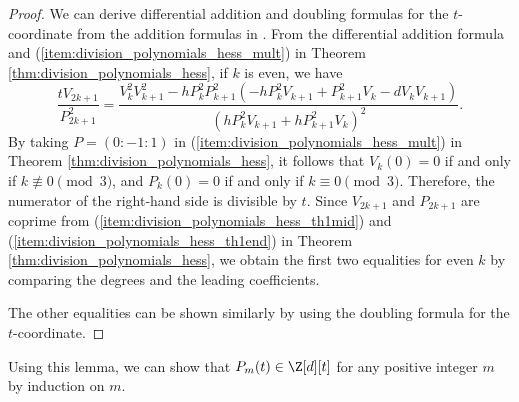 \documentclass{amsart}
\theoremstyle{definition}
\theoremstyle{remark}
\numberwithin{equation}{section}
\begin{document}
\begin{proof}
    We can derive differential addition and doubling formulas
    for the $t$-coordinate from the addition formulas in \cite[\S 2.1]{PKC:FarJoy10}.
    From the differential addition formula and
    (\ref{item:division_polynomials_hess_mult}) in Theorem \ref{thm:division_polynomials_hess},
    if $k$ is even, we have
    \begin{equation*}
        \frac{tV_{2k+1}}{P_{2k+1}^2}
        =
        \frac{V_k^2V_{k+1}^2 - hP_k^2 P_{k+1}^2
                        (-hP_k^2V_{k+1} + P_{k+1}^2 V_k - dV_kV_{k+1})}
            {(hP_k^2 V_{k+1} +hP_{k+1}^2 V_k)^2}.
    \end{equation*}
    By taking $P = (0:-1:1)$ in (\ref{item:division_polynomials_hess_mult}) in Theorem \ref{thm:division_polynomials_hess},
    it follows that $V_k(0) = 0$ if and only if $k \not\equiv 0 \pmod{3}$,
    and $P_k(0) = 0$ if and only if $k \equiv 0 \pmod{3}$.
    Therefore, the numerator of the right-hand side is divisible by $t$.
    Since $V_{2k+1}$ and $P_{2k+1}$ are coprime from
    (\ref{item:division_polynomials_hess_th1mid}) and (\ref{item:division_polynomials_hess_th1end}) in Theorem \ref{thm:division_polynomials_hess},
    we obtain the first two equalities for even $k$
    by comparing the degrees and the leading coefficients.

    The other equalities can be shown similarly by using
    the doubling formula for the $t$-coordinate.
\end{proof}
Using this lemma,
we can show that $P_m(t) \in \Z[d][t]$ for any positive integer $m$
by induction on $m$.
\end{document}
